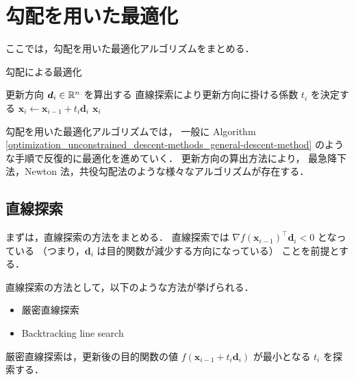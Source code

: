 %

\section{勾配を用いた最適化}

ここでは，勾配を用いた最適化アルゴリズムをまとめる．

\begin{algorithm}[tp]
    \caption{勾配による最適化}
    \label{optimization_unconstrained_descent-methods_general-descent-method}
    \begin{algorithmic}
                \State 更新方向 $\bm{d}_i \in \mathbb{R}^n$ を算出する
                \State 直線探索により更新方向に掛ける係数 $t_i$ を決定する
                \State $\bm{x}_i \gets \bm{x}_{i-1} + t_i \bm{d}_i$
                    \State \Return $\bm{x}_i$
                \EndIf
            \EndFor
        \EndProcedure
    \end{algorithmic}
\end{algorithm}

勾配を用いた最適化アルゴリズムでは，
一般に
Algorithm \ref{optimization_unconstrained_descent-methods_general-descent-method}
のような手順で反復的に最適化を進めていく．
更新方向の算出方法により，
最急降下法，Newton 法，共役勾配法のような様々なアルゴリズムが存在する．

\subsection{直線探索}

まずは，直線探索の方法をまとめる．
直線探索では
$\nabla f(\bm{x}_{i-1})^\top \bm{d}_i < 0$ となっている
（つまり，$\bm{d}_i$ は目的関数が減少する方向になっている）
ことを前提とする．

直線探索の方法として，以下のような方法が挙げられる．

\begin{itemize}
    \item 厳密直線探索
    \item Backtracking line search
\end{itemize}

厳密直線探索は，更新後の目的関数の値
$f(\bm{x}_{i-1} + t_i \bm{d}_i)$
が最小となる $t_i$ を探索する．

